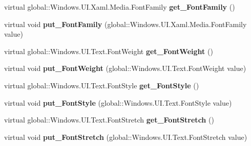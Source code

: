 \begin{DoxyCompactItemize}
virtual global\+::\+Windows.\+U\+I.\+Xaml.\+Media.\+Font\+Family {\bfseries get\+\_\+\+Font\+Family} ()
\item 
\mbox{\label{class_windows_1_1_u_i_1_1_xaml_1_1_controls_1_1_control_af2d5ee1323dfd2ae954b480a76f90bba}} 
virtual void {\bfseries put\+\_\+\+Font\+Family} (global\+::\+Windows.\+U\+I.\+Xaml.\+Media.\+Font\+Family value)
\item 
\mbox{\label{class_windows_1_1_u_i_1_1_xaml_1_1_controls_1_1_control_a7ebe7963613a80ab54042ed42d0fa16d}} 
virtual global\+::\+Windows.\+U\+I.\+Text.\+Font\+Weight {\bfseries get\+\_\+\+Font\+Weight} ()
\item 
\mbox{\label{class_windows_1_1_u_i_1_1_xaml_1_1_controls_1_1_control_acf14fc60ff1e6b2aacf2503e680ebc89}} 
virtual void {\bfseries put\+\_\+\+Font\+Weight} (global\+::\+Windows.\+U\+I.\+Text.\+Font\+Weight value)
\item 
\mbox{\label{class_windows_1_1_u_i_1_1_xaml_1_1_controls_1_1_control_a3083dad6568d1d20caa957d9a785e415}} 
virtual global\+::\+Windows.\+U\+I.\+Text.\+Font\+Style {\bfseries get\+\_\+\+Font\+Style} ()
\item 
\mbox{\label{class_windows_1_1_u_i_1_1_xaml_1_1_controls_1_1_control_a823b5b7960c23d5b8bb2f92876534959}} 
virtual void {\bfseries put\+\_\+\+Font\+Style} (global\+::\+Windows.\+U\+I.\+Text.\+Font\+Style value)
\item 
\mbox{\label{class_windows_1_1_u_i_1_1_xaml_1_1_controls_1_1_control_a8ded01d56e501532b1c98b68fa92f29f}} 
virtual global\+::\+Windows.\+U\+I.\+Text.\+Font\+Stretch {\bfseries get\+\_\+\+Font\+Stretch} ()
\item 
\mbox{\label{class_windows_1_1_u_i_1_1_xaml_1_1_controls_1_1_control_adaa41b9c66a1b753259be5ba549c232e}} 
virtual void {\bfseries put\+\_\+\+Font\+Stretch} (global\+::\+Windows.\+U\+I.\+Text.\+Font\+Stretch value)

\end{DoxyCompactItemize}
